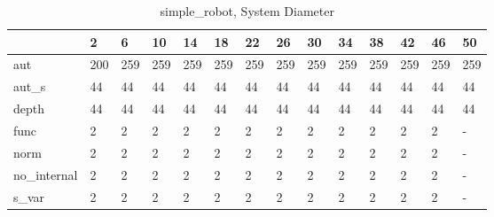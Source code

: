 \begin{table}
\caption{simple_robot, System Diameter}
\label{simple_robot_diam}
\begin{tabular}{llllllllllllll}
\toprule
 & 2 & 6 & 10 & 14 & 18 & 22 & 26 & 30 & 34 & 38 & 42 & 46 & 50 \\
\midrule
aut & 200 & 259 & 259 & 259 & 259 & 259 & 259 & 259 & 259 & 259 & 259 & 259 & 259 \\
aut_s & 44 & 44 & 44 & 44 & 44 & 44 & 44 & 44 & 44 & 44 & 44 & 44 & 44 \\
depth & 44 & 44 & 44 & 44 & 44 & 44 & 44 & 44 & 44 & 44 & 44 & 44 & 44 \\
func & 2 & 2 & 2 & 2 & 2 & 2 & 2 & 2 & 2 & 2 & 2 & 2 & - \\
norm & 2 & 2 & 2 & 2 & 2 & 2 & 2 & 2 & 2 & 2 & 2 & 2 & - \\
no_internal & 2 & 2 & 2 & 2 & 2 & 2 & 2 & 2 & 2 & 2 & 2 & 2 & - \\
s_var & 2 & 2 & 2 & 2 & 2 & 2 & 2 & 2 & 2 & 2 & 2 & 2 & - \\
\bottomrule
\end{tabular}
\end{table}
